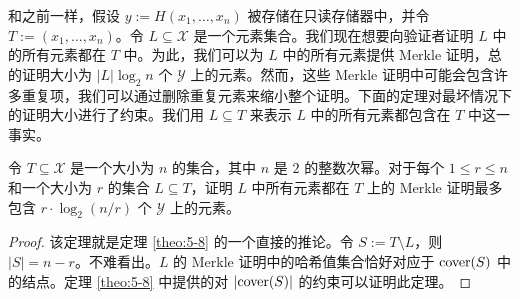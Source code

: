 \begin{snote}[为多个元素提供成员证明。]
和之前一样，假设 $y:=H(x_1,\dots,x_n)$ 被存储在只读存储器中，并令 $T:=(x_1,\dots,x_n)$。令 $L\subseteq\mathcal{X}$ 是一个元素集合。我们现在想要向验证者证明 $L$ 中的所有元素都在 $T$ 中。为此，我们可以为 $L$ 中的所有元素提供 Merkle 证明，总的证明大小为 $|L|\log_2n$ 个 $\mathcal{Y}$ 上的元素。然而，这些 Merkle 证明中可能会包含许多重复项，我们可以通过删除重复元素来缩小整个证明。下面的定理对最坏情况下的证明大小进行了约束。我们用 $L\subseteq T$ 来表示 $L$ 中的所有元素都包含在 $T$ 中这一事实。
\end{snote}

\begin{theorem}\label{theo:8-7}
令 $T\subseteq\mathcal{X}$ 是一个大小为 $n$ 的集合，其中 $n$ 是 $2$ 的整数次幂。对于每个 $1\leq r\leq n$ 和一个大小为 $r$ 的集合 $L\subseteq T$，证明 $L$ 中所有元素都在 $T$ 上的 Merkle 证明最多包含 $r\cdot\log_2({n}/{r})$ 个 $\mathcal{Y}$ 上的元素。
\end{theorem}

\begin{proof}
该定理就是定理 \ref{theo:5-8} 的一个直接的推论。令 $S:=T\setminus L$，则 $|S|=n-r$。不难看出。$L$ 的 Merkle 证明中的哈希值集合恰好对应于 ${\rm cover}(S)$ 中的结点。定理 \ref{theo:5-8} 中提供的对 $|{\rm cover}(S)|$ 的约束可以证明此定理。
\end{proof}


